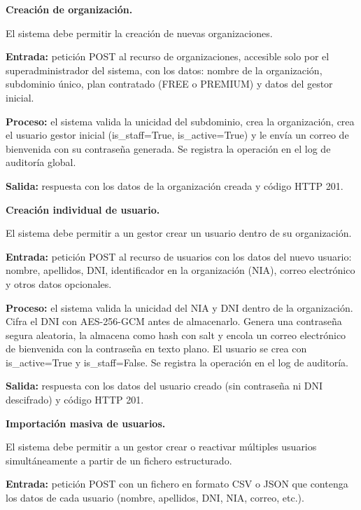 \begin{functional}
  \begin{functional}
    \item \textbf{Creación de organización.}

    El sistema debe permitir la creación de nuevas organizaciones.

    \textbf{Entrada:} petición POST al recurso de organizaciones, accesible solo por el superadministrador del sistema, con los datos: nombre de la organización, subdominio único, plan contratado (FREE o PREMIUM) y datos del gestor inicial.

    \textbf{Proceso:} el sistema valida la unicidad del subdominio, crea la organización, crea el usuario gestor inicial (is\_staff=True, is\_active=True) y le envía un correo de bienvenida con su contraseña generada. Se registra la operación en el log de auditoría global.

    \textbf{Salida:} respuesta con los datos de la organización creada y código HTTP 201.

    \item \textbf{Creación individual de usuario.}

    El sistema debe permitir a un gestor crear un usuario dentro de su organización.

    \textbf{Entrada:} petición POST al recurso de usuarios con los datos del nuevo usuario: nombre, apellidos, DNI, identificador en la organización (NIA), correo electrónico y otros datos opcionales.

    \textbf{Proceso:} el sistema valida la unicidad del NIA y DNI dentro de la organización. Cifra el DNI con AES-256-GCM antes de almacenarlo. Genera una contraseña segura aleatoria, la almacena como hash con salt y encola un correo electrónico de bienvenida con la contraseña en texto plano. El usuario se crea con is\_active=True y is\_staff=False. Se registra la operación en el log de auditoría.

    \textbf{Salida:} respuesta con los datos del usuario creado (sin contraseña ni DNI descifrado) y código HTTP 201.

    \item \textbf{Importación masiva de usuarios.}

    El sistema debe permitir a un gestor crear o reactivar múltiples usuarios simultáneamente a partir de un fichero estructurado.

    \textbf{Entrada:} petición POST con un fichero en formato CSV o JSON que contenga los datos de cada usuario (nombre, apellidos, DNI, NIA, correo, etc.).


\end{functional}
\end{functional}
